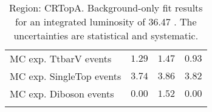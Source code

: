 \begin{table}
\begin{center}
{\begin{tabular*}{\textwidth}{@{\extracolsep{\fill}}lrrr}
        MC exp. TtbarV events         & $1.29$          & $1.47$          & $0.93$              \\
        MC exp. SingleTop events         & $3.74$          & $3.86$          & $3.82$              \\
        MC exp. Diboson events         & $0.00$          & $1.52$          & $0.00$              \\
\noalign{\smallskip}\hline\noalign{\smallskip}
\end{tabular*}
}
\end{center}
\caption{Region: CRTopA. Background-only fit results for an integrated luminosity of 36.47 \ifb. The uncertainties are statistical and systematic.
}
\label{table.bkgonly.CRTopA}
\end{table}
%